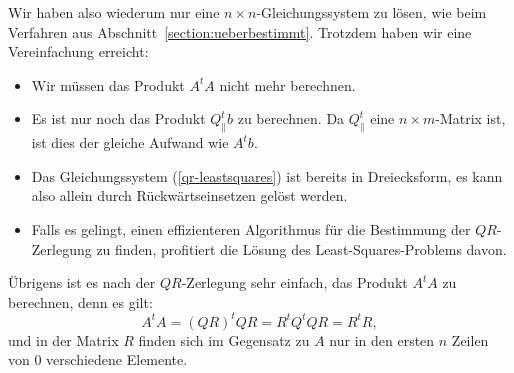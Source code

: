 Wir haben also wiederum nur eine $n\times n$-Gleichungssystem
zu lösen, wie beim Verfahren aus Abschnitt~\ref{section:ueberbestimmt}.
Trotzdem haben wir eine Vereinfachung erreicht:
\begin{itemize}
\item Wir müssen das Produkt $A^tA$ nicht mehr berechnen.
\item Es ist nur noch das Produkt $Q_{\|}^tb$ zu berechnen.
Da $Q_{\|}^t$
eine $n\times m$-Matrix ist, ist dies der gleiche Aufwand wie $A^tb$.
\item Das Gleichungssystem (\ref{qr-leastsquares}) ist bereits in Dreiecksform,
es kann also allein durch Rückwärtseinsetzen gelöst werden.
\item Falls es gelingt, einen effizienteren Algorithmus für die Bestimmung
der $QR$-Zerlegung zu finden, profitiert die Lösung des Least-Squares-Problems
davon.
\end{itemize}
Übrigens ist es nach der $QR$-Zerlegung sehr einfach, das Produkt $A^tA$
zu berechnen, denn es gilt:
\[
A^tA=(QR)^tQR=R^tQ^tQR=R^tR,
\]
und in der Matrix $R$ finden sich im Gegensatz zu $A$
nur in den ersten $n$ Zeilen von $0$ verschiedene Elemente.

